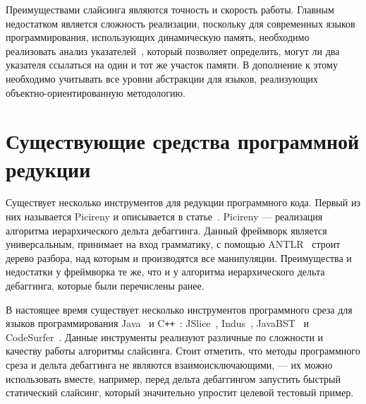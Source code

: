 Преимуществами слайсинга являются точность и скорость работы. Главным недостатком является сложность реализации, поскольку для современных языков программирования, использующих динамическую память, необходимо реализовать анализ указателей~\cite{deutsch1994interprocedural}, который позволяет определить, могут ли два указателя ссылаться на один и тот же участок памяти. В дополнение к этому необходимо учитывать все уровни абстракции для языков, реализующих объектно-ориентированную методологию.

\section{Существующие средства программной редукции}
Существует несколько инструментов для редукции программного кода. Первый из них называется Picireny и описывается в статье~\cite{hodovan2017tree}. Picireny --- реализация алгоритма иерархического дельта дебаггинга. Данный фреймворк является универсальным, принимает на вход грамматику, с помощью ANTLR~\cite{parr2013definitive} строит дерево разбора, над которым и производятся все манипуляции. Преимущества и недостатки у фреймворка те же, что и у алгоритма иерархического дельта дебаггинга, которые были перечислены ранее. 

В настоящее время существует несколько инструментов программного среза для языков программирования Java~\cite{gosling2000java} и C\texttt{++}~\cite{ellis1990annotated}: JSlice~\cite{WR:04}, Indus~\cite{jayaraman2005kaveri}, JavaBST~\cite{abdallah2017javabst} и CodeSurfer~\cite{anderson2004codesurfer}. Данные инструменты реализуют различные по сложности и качеству работы алгоритмы слайсинга. Стоит отметить, что методы программного среза и дельта дебаггинга не являются взаимоисключающими, --- их можно использовать вместе, например, перед дельта дебаггингом запустить быстрый статический слайсинг, который значительно упростит целевой тестовый пример.

